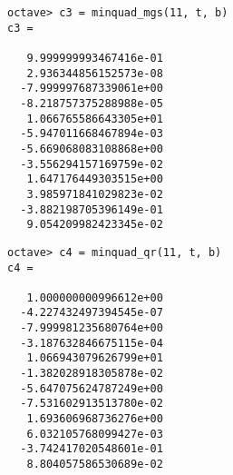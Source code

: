 \begin{lstlisting}[numbers=none]
octave> c3 = minquad_mgs(11, t, b)
c3 =

   9.999999993467416e-01
   2.936344856152573e-08
  -7.999997687339061e+00
  -8.218757375288988e-05
   1.066765586643305e+01
  -5.947011668467894e-03
  -5.669068083108868e+00
  -3.556294157169759e-02
   1.647176449303515e+00
   3.985971841029823e-02
  -3.882198705396149e-01
   9.054209982423345e-02
\end{lstlisting}
%
%
\begin{lstlisting}[numbers=none]
octave> c4 = minquad_qr(11, t, b)
c4 =

   1.000000000996612e+00
  -4.227432497394545e-07
  -7.999981235680764e+00
  -3.187632846675115e-04
   1.066943079626799e+01
  -1.382028918305878e-02
  -5.647075624787249e+00
  -7.531602913513780e-02
   1.693606968736276e+00
   6.032105768099427e-03
  -3.742417020548601e-01
   8.804057586530689e-02
\end{lstlisting}
